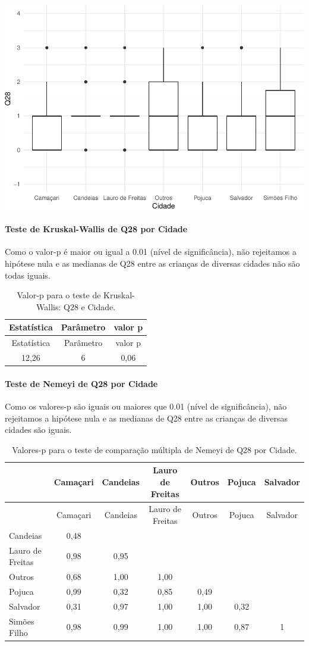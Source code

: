 \documentclass[]{article}
\let\oldparagraph\paragraph
\renewcommand{\paragraph}[1]{\oldparagraph{#1}\mbox{}}
\begin{document}
\begin{center}\includegraphics[width=0.75\linewidth]{relatorio_covid19_files/figure-latex/unnamed-chunk-843-1} \end{center}

\hypertarget{teste-de-kruskal-wallis-de-q28-por-cidade}{%
\paragraph{Teste de Kruskal-Wallis de Q28 por Cidade}\label{teste-de-kruskal-wallis-de-q28-por-cidade}}

Como o valor-p é maior ou igual a 0.01 (nível de significância), não rejeitamos a hipótese nula e as medianas de Q28 entre as crianças de diversas cidades não são todas iguais.

\begin{longtable}[]{@{}ccc@{}}
\caption{\label{tab:unnamed-chunk-845}Valor-p para o teste de Kruskal-Wallis: Q28 e Cidade.}\tabularnewline
\toprule
Estatística & Parâmetro & valor p\tabularnewline
\midrule
\endfirsthead
\toprule
Estatística & Parâmetro & valor p\tabularnewline
\midrule
\endhead
12,26 & 6 & 0,06\tabularnewline
\bottomrule
\end{longtable}

\hypertarget{teste-de-nemeyi-de-q28-por-cidade}{%
\paragraph{Teste de Nemeyi de Q28 por Cidade}\label{teste-de-nemeyi-de-q28-por-cidade}}

Como os valores-p são iguais ou maiores que 0.01 (nível de significância), não rejeitamos a hipótese nula e as medianas de Q28 entre as crianças de diversas cidades são iguais.

\begin{longtable}[]{@{}lcccccc@{}}
\caption{\label{tab:unnamed-chunk-847}Valores-p para o teste de comparação múltipla de Nemeyi de Q28 por Cidade.}\tabularnewline
\toprule
& Camaçari & Candeias & Lauro de Freitas & Outros & Pojuca & Salvador\tabularnewline
\midrule
\endfirsthead
\toprule
& Camaçari & Candeias & Lauro de Freitas & Outros & Pojuca & Salvador\tabularnewline
\midrule
\endhead
Candeias & 0,48 & & & & &\tabularnewline
Lauro de Freitas & 0,98 & 0,95 & & & &\tabularnewline
Outros & 0,68 & 1,00 & 1,00 & & &\tabularnewline
Pojuca & 0,99 & 0,32 & 0,85 & 0,49 & &\tabularnewline
Salvador & 0,31 & 0,97 & 1,00 & 1,00 & 0,32 &\tabularnewline
Simões Filho & 0,98 & 0,99 & 1,00 & 1,00 & 0,87 & 1\tabularnewline
\bottomrule
\end{longtable}
\end{document}
